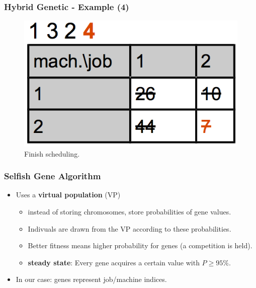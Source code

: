 \begin{frame}
  \frametitle{Hybrid Genetic - Example (4)}

\begin{figure}[htbp]
	\centering
		\includegraphics[scale=1]{images/hyb4.png}
	\caption{Finish scheduling.}
	\label{fig:label}
\end{figure}
	
 
\end{frame}


\begin{frame}
  \frametitle{Selfish Gene Algorithm}

\begin{itemize}

	\item Uses a \textbf{virtual population} (VP)%

	\begin{itemize}
		\item instead of storing chromosomes, store probabilities of gene values.

		\item Indivuals are drawn from the VP according to these probabilities.

		\item Better fitness means higher probability for genes (a competition is held).
	
		\item \textbf{steady state}: Every gene acquires a certain value with  $P \geq 95\%$.
	\end{itemize}
	\item In our case: genes represent job/machine indices.
\end{itemize}

\end{frame}

